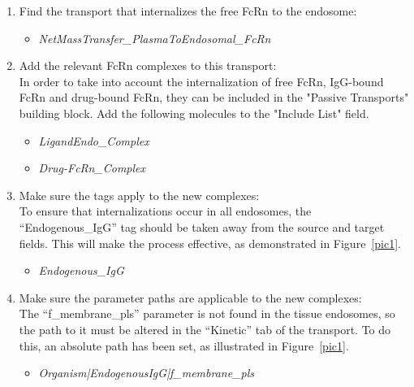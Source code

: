 \documentclass[fleqn,10pt]{physiome}
\begin{document}
\begin{enumerate}[label=(\roman*)]
    \item {Find the transport that internalizes the free FcRn to the endosome:}
    \begin{itemize}
        \item \textit{NetMassTransfer\_PlasmaToEndosomal\_FcRn}
    \end{itemize}
    \item {Add the relevant FcRn complexes to this transport:} \\
In order to take into account the internalization of free FcRn, IgG-bound FcRn and drug-bound FcRn, they can be included in the "Passive Transports" building block. Add the following molecules to the "Include List" field.
    \begin{itemize}
        \item \textit{LigandEndo\_Complex}
        \item \textit{Drug-FcRn\_Complex}
    \end{itemize}
    \item{Make sure the tags apply to the new complexes:} \\
To ensure that internalizations occur in all endosomes, the ``Endogenous\_IgG'' tag should be taken away from the source and target fields. This will make the process effective, as demonstrated in Figure~\ref{pic1}.
    \begin{itemize}
        \item \textit{Endogenous\_IgG}
    \end{itemize}
	\item{Make sure the parameter paths are applicable to the new complexes:}\\
The ``f\_membrane\_pls'' parameter is not found in the tissue endosomes, so the path to it must be altered in the ``Kinetic'' tab of the transport. To do this, an absolute path has been set, as illustrated in Figure~\ref{pic1}.
    \begin{itemize}
        \item \textit{Organism|EndogenousIgG|f\_membrane\_pls}
    \end{itemize}
\end{enumerate}
\end{document}
